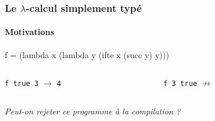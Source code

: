 \documentclass{beamer}
\begin{document}
\begin{frame}[b,fragile]
\frametitle{Le $\lambda$-calcul simplement typé}
\framesubtitle{Motivations} 

\begin{block}{}
  f = (lambda x (lambda y (ifte x (succ y) y)))
\end{block}

\vfill

\begin{columns}
  \begin{column}{.3\linewidth}
    \lstinline!f true 3! $\rightarrow$ \lstinline!4!
  \end{column}
  \begin{column}{.3\linewidth}
    \lstinline!f 3 true! $\not\rightarrow$
  \end{column}
\end{columns}

\vfill

\begin{flushright}
  \large{\textit{Peut-on rejeter ce programme à la compilation ?}}
\end{flushright}


\end{frame}
\end{document}
